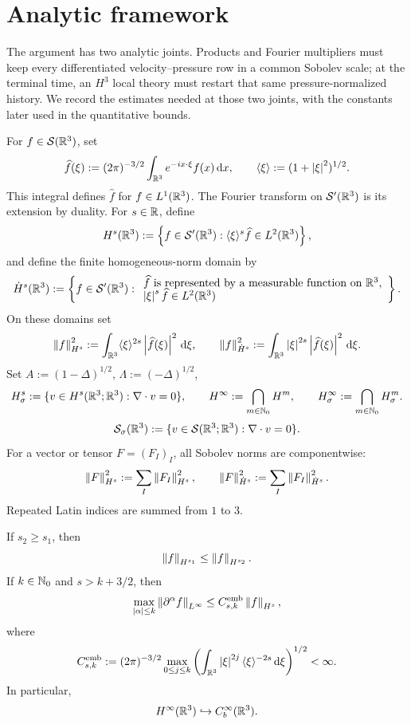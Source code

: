 \section{Analytic framework}

The argument has two analytic joints.  Products and Fourier multipliers must
keep every differentiated velocity--pressure row in a common Sobolev scale;
at the terminal time, an \(H^3\) local theory must restart that same
pressure-normalized history.  We record the estimates needed at those two
joints, with the constants later used in the quantitative bounds.

\begin{definition}
For \(f\in\mathcal S(\mathbb R^3)\), set
\[
 \widehat f(\xi):=(2\pi)^{-3/2}\int_{\mathbb R^3}e^{-ix\cdot\xi}f(x)\,\mathrm d x,
 \qquad
 \langle\xi\rangle:=(1+\left|\xi\right|^2)^{1/2}.
\]
This integral defines \(\widehat f\) for \(f\in L^1(\mathbb R^3)\).  The
Fourier transform on \(\mathcal S'(\mathbb R^3)\) is its extension by duality.
For \(s\in\mathbb R\), define
\[
 H^s(\mathbb R^3):=
 \left\{f\in\mathcal S'(\mathbb R^3):
       \langle\xi\rangle^s\widehat f\in L^2(\mathbb R^3)\right\},
\]
and define the finite homogeneous-norm domain by
\[
 \dot H^s(\mathbb R^3):=
 \left\{f\in\mathcal S'(\mathbb R^3):
 \begin{array}{l}
 \widehat f\text{ is represented by a measurable function on }\mathbb R^3,\\[-2pt]
 \left|\xi\right|^s\widehat f\in L^2(\mathbb R^3)
 \end{array}
 \right\}.
\]
On these domains set
\[
 \left\lVert f\right\rVert_{H^s}^2:=\int_{\mathbb R^3}\langle\xi\rangle^{2s}
 \left|\widehat f(\xi)\right|^2\,\mathrm d\xi,
 \qquad
 \left\lVert f\right\rVert_{\dot H^s}^2:=\int_{\mathbb R^3}\left|\xi\right|^{2s}
 \left|\widehat f(\xi)\right|^2\,\mathrm d\xi.
\]
Set \(A:=(1-\Delta)^{1/2}\), \(\Lambda:=(-\Delta)^{1/2}\),
\[
 H^s_\sigma:=\{v\in H^s(\mathbb R^3;\mathbb R^3):\nabla\cdot v=0\},
 \qquad
 H^\infty:=\bigcap_{m\in\mathbb N_0}H^m,
 \qquad
 H^\infty_\sigma:=\bigcap_{m\in\mathbb N_0}H^m_\sigma.
\]
\[
 \mathcal S_\sigma(\mathbb R^3):=
 \{v\in\mathcal S(\mathbb R^3;\mathbb R^3):\nabla\cdot v=0\}.
\]
For a vector or tensor \(F=(F_I)_I\), all Sobolev norms are componentwise:
\[
 \left\lVert F\right\rVert_{H^s}^2:=\sum_I\left\lVert F_I\right\rVert_{H^s}^2,
 \qquad
 \left\lVert F\right\rVert_{\dot H^s}^2:=\sum_I\left\lVert F_I\right\rVert_{\dot H^s}^2.
\]
Repeated Latin indices are summed from \(1\) to \(3\).
\end{definition}

\begin{lemma}
\label{f:lem:sobolev-embedding}
If \(s_2\ge s_1\), then
\[
 \left\lVert f\right\rVert_{H^{s_1}}\le\left\lVert f\right\rVert_{H^{s_2}}.
\]
If \(k\in\mathbb N_0\) and \(s>k+3/2\), then
\[
 \max_{\left|\alpha\right|\le k}\left\lVert \partial^\alpha f\right\rVert_{L^\infty}
 \le C_{s,k}^{\rm emb}\left\lVert f\right\rVert_{H^s},
\]
where
\[
 C_{s,k}^{\rm emb}:=(2\pi)^{-3/2}
 \max_{0\le j\le k}
 \left(\int_{\mathbb R^3}\left|\xi\right|^{2j}\langle\xi\rangle^{-2s}\,\mathrm d\xi\right)^{1/2}<\infty.
\]
In particular,
\[
 H^\infty(\mathbb R^3)\hookrightarrow C_b^\infty(\mathbb R^3).
\]
\end{lemma}

